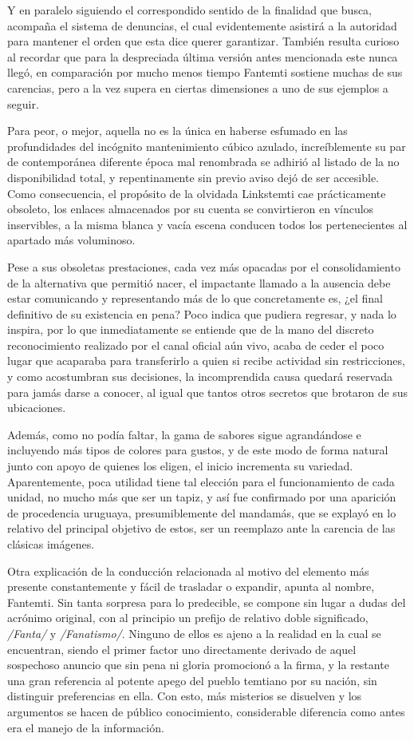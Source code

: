 \documentclass[
]{book}
\begin{document}
Y en paralelo siguiendo el correspondido sentido de la finalidad que busca, acompaña el sistema de denuncias, el cual evidentemente asistirá a la autoridad para mantener el orden que esta dice querer garantizar. También resulta curioso al recordar que para la despreciada última versión antes mencionada este nunca llegó, en comparación por mucho menos tiempo Fantemti sostiene muchas de sus carencias, pero a la vez supera en ciertas dimensiones a uno de sus ejemplos a seguir.

Para peor, o mejor, aquella no es la única en haberse esfumado en las profundidades del incógnito mantenimiento cúbico azulado, increíblemente su par de contemporánea diferente época mal renombrada se adhirió al listado de la no disponibilidad total, y repentinamente sin previo aviso dejó de ser accesible. Como consecuencia, el propósito de la olvidada Linkstemti cae prácticamente obsoleto, los enlaces almacenados por su cuenta se convirtieron en vínculos inservibles, a la misma blanca y vacía escena conducen todos los pertenecientes al apartado más voluminoso.

Pese a sus obsoletas prestaciones, cada vez más opacadas por el consolidamiento de la alternativa que permitió nacer, el impactante llamado a la ausencia debe estar comunicando y representando más de lo que concretamente es, ¿el final definitivo de su existencia en pena? Poco indica que pudiera regresar, y nada lo inspira, por lo que inmediatamente se entiende que de la mano del discreto reconocimiento realizado por el canal oficial aún vivo, acaba de ceder el poco lugar que acaparaba para transferirlo a quien si recibe actividad sin restricciones, y como acostumbran sus decisiones, la incomprendida causa quedará reservada para jamás darse a conocer, al igual que tantos otros secretos que brotaron de sus ubicaciones.

Además, como no podía faltar, la gama de sabores sigue agrandándose e incluyendo más tipos de colores para gustos, y de este modo de forma natural junto con apoyo de quienes los eligen, el inicio incrementa su variedad. Aparentemente, poca utilidad tiene tal elección para el funcionamiento de cada unidad, no mucho más que ser un tapiz, y así fue confirmado por una aparición de procedencia uruguaya, presumiblemente del mandamás, que se explayó en lo relativo del principal objetivo de estos, ser un reemplazo ante la carencia de las clásicas imágenes.

Otra explicación de la conducción relacionada al motivo del elemento más presente constantemente y fácil de trasladar o expandir, apunta al nombre, Fantemti. Sin tanta sorpresa para lo predecible, se compone sin lugar a dudas del acrónimo original, con al principio un prefijo de relativo doble significado, \emph{/Fanta/} y \emph{/Fanatismo/}. Ninguno de ellos es ajeno a la realidad en la cual se encuentran, siendo el primer factor uno directamente derivado de aquel sospechoso anuncio que sin pena ni gloria promocionó a la firma, y la restante una gran referencia al potente apego del pueblo temtiano por su nación, sin distinguir preferencias en ella. Con esto, más misterios se disuelven y los argumentos se hacen de público conocimiento, considerable diferencia como antes era el manejo de la información.
\end{document}
